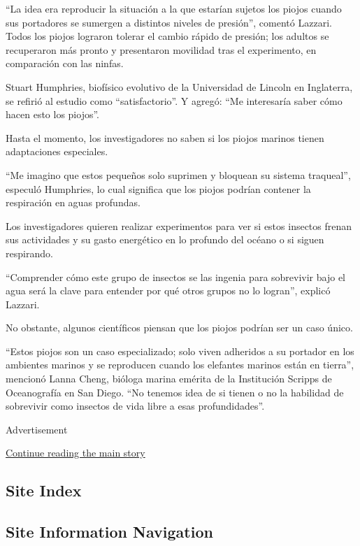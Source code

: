 ``La idea era reproducir la situación a la que estarían sujetos los
piojos cuando sus portadores se sumergen a distintos niveles de
presión'', comentó Lazzari. Todos los piojos lograron tolerar el cambio
rápido de presión; los adultos se recuperaron más pronto y presentaron
movilidad tras el experimento, en comparación con las ninfas.

Stuart Humphries, biofísico evolutivo de la Universidad de Lincoln en
Inglaterra, se refirió al estudio como ``satisfactorio''. Y agregó: ``Me
interesaría saber cómo hacen esto los piojos''.

Hasta el momento, los investigadores no saben si los piojos marinos
tienen adaptaciones especiales.

``Me imagino que estos pequeños solo suprimen y bloquean su sistema
traqueal'', especuló Humphries, lo cual significa que los piojos podrían
contener la respiración en aguas profundas.

Los investigadores quieren realizar experimentos para ver si estos
insectos frenan sus actividades y su gasto energético en lo profundo del
océano o si siguen respirando.

``Comprender cómo este grupo de insectos se las ingenia para sobrevivir
bajo el agua será la clave para entender por qué otros grupos no lo
logran'', explicó Lazzari.

No obstante, algunos científicos piensan que los piojos podrían ser un
caso único.

``Estos piojos son un caso especializado; solo viven adheridos a su
portador en los ambientes marinos y se reproducen cuando los elefantes
marinos están en tierra'', mencionó Lanna Cheng, bióloga marina emérita
de la Institución Scripps de Oceanografía en San Diego. ``No tenemos
idea de si tienen o no la habilidad de sobrevivir como insectos de vida
libre a esas profundidades''.

Advertisement

\protect\hyperlink{after-bottom}{Continue reading the main story}

\hypertarget{site-index}{%
\subsection{Site Index}\label{site-index}}

\hypertarget{site-information-navigation}{%
\subsection{Site Information
Navigation}\label{site-information-navigation}}

